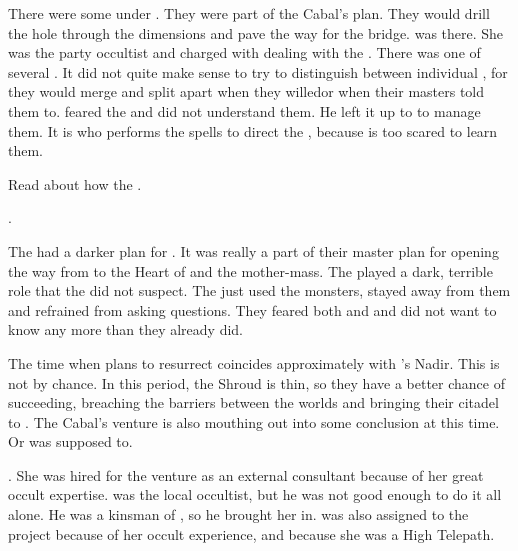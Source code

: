 There were some \noggyaleth under \Malcur.
They were part of the Cabal's plan.
They would drill the hole through the dimensions and pave the way for the bridge.
\Urizeth was there.
She was the party occultist and charged with dealing with the \noggyaleth.
There was one of several \noggyaleth.
It did not quite make sense to try to distinguish between individual \noggyaleth, for they would merge and split apart when they willed\dash{}or when their masters told them to.
\Teshrial feared the \noggyaleth and did not understand them.
He left it up to \Urizeth to manage them.
It is \Urizeth who performs the spells to direct the \noggyaleth, because \Teshrial is too scared to learn them. 

Read about how the \noggyaleth {}. 

\Teshrial {}. 

The \banes had a darker plan for \Malcur.
It was really a part of their master plan for opening the way from \Erebos to the Heart of \Miith and the \noggyal mother-mass.
The \noggyaleth played a dark, terrible role that the \resphain did not suspect.
The \resphain just used the monsters, stayed away from them and refrained from asking questions.
They feared both \noggyaleth and \banes and did not want to know any more than they already did.

The time when \Secherdamon plans to resurrect \Nithdornazsh coincides approximately with \Ishnaruchaefir's Nadir.
This is not by chance. 
In this period, the Shroud is thin, so they have a better chance of succeeding, breaching the barriers between the worlds and bringing their citadel to \Azmith. 
The Cabal's \Malcur venture is also mouthing out into some conclusion at this time. 
Or was supposed to. 

. 
She was hired for the \Malcur venture as an external consultant because of her great occult expertise. 
\Ganethed was the local occultist, but he was not good enough to do it all alone. 
He was a kinsman of \Urizeth, so he brought her in. 
\Achsah was also assigned to the project because of her occult experience, and because she was a High Telepath. 





